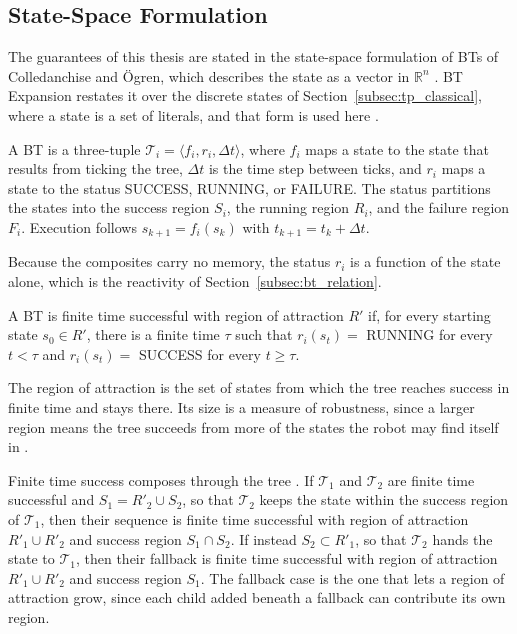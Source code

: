     \subsection{State-Space Formulation}
    \label{subsec:bt_statespace}
    The guarantees of this thesis are stated in the state-space formulation of BTs of Colledanchise and Ögren, which describes the state as a vector in $\mathbb{R}^n$ \cite{colledanchise2017tro, colledanchise2018book}.
    BT Expansion restates it over the discrete states of Section~\ref{subsec:tp_classical}, where a state is a set of literals, and that form is used here \cite{cai2021}.
    
    \begin{definition}
    \label{def:bt}
        A BT is a three-tuple $\mathcal{T}_i = \langle f_i, r_i, \Delta t \rangle$, where $f_i$ maps a state to the state that results from ticking the tree, $\Delta t$ is the time step between ticks, and $r_i$ maps a state to the status SUCCESS, RUNNING, or FAILURE.
        The status partitions the states into the success region $S_i$, the running region $R_i$, and the failure region $F_i$.
        Execution follows $s_{k+1} = f_i(s_k)$ with $t_{k+1} = t_k + \Delta t$.
    \end{definition}

    Because the composites carry no memory, the status $r_i$ is a function of the state alone, which is the reactivity of Section~\ref{subsec:bt_relation}.

    \begin{definition}
    \label{def:fts}
        A BT is finite time successful with region of attraction $R'$ if, for every starting state $s_0 \in R'$, there is a finite time $\tau$ such that $r_i(s_t) = $ RUNNING for every $t < \tau$ and $r_i(s_t) = $ SUCCESS for every $t \geq \tau$.
    \end{definition}
    
    The region of attraction is the set of states from which the tree reaches success in finite time and stays there.
    Its size is a measure of robustness, since a larger region means the tree succeeds from more of the states the robot may find itself in \cite{colledanchise2017tro}.

    Finite time success composes through the tree \cite{colledanchise2017tro, colledanchise2018book}.
    If $\mathcal{T}_1$ and $\mathcal{T}_2$ are finite time successful and $S_1 = R'_2 \cup S_2$, so that $\mathcal{T}_2$ keeps the state within the success region of $\mathcal{T}_1$, then their sequence is finite time successful with region of attraction $R'_1 \cup R'_2$ and success region $S_1 \cap S_2$.
    If instead $S_2 \subset R'_1$, so that $\mathcal{T}_2$ hands the state to $\mathcal{T}_1$, then their fallback is finite time successful with region of attraction $R'_1 \cup R'_2$ and success region $S_1$.
    The fallback case is the one that lets a region of attraction grow, since each child added beneath a fallback can contribute its own region.

